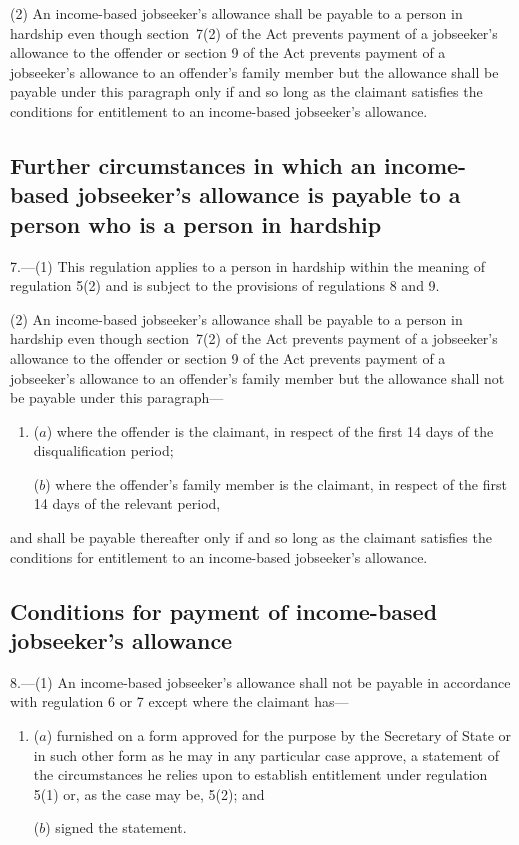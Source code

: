 \documentclass[12pt,a4paper]{article}
\begin{document}
(2) An income-based jobseeker’s allowance shall be payable to a person in hardship even though section~7(2) of the Act prevents payment of a jobseeker’s allowance to the offender or section 9 of the Act prevents payment of a jobseeker’s allowance to an offender’s family member but the allowance shall be payable under this paragraph only if and so long as the claimant satisfies the conditions for entitlement to an income-based jobseeker’s allowance.

{
\subsection[7. Further circumstances in which an income-based jobseeker’s allowance is payable to a person who is a person in hardship]{\sloppy Further circumstances in which an income-based jobseeker’s allowance is payable to a person who is a person in hardship}

}

7.---(1)  This regulation applies to a person in hardship within the meaning of regulation 5(2) and is subject to the provisions of regulations 8 and 9.

(2) An income-based jobseeker’s allowance shall be payable to a person in hardship even though section~7(2) of the Act prevents payment of a jobseeker’s allowance to the offender or section 9 of the Act prevents payment of a jobseeker’s allowance to an offender’s family member but the allowance shall not be payable under this paragraph—
\begin{enumerate}\item[]
($a$) where the offender is the claimant, in respect of the first 14 days of the disqualification period;

($b$) where the offender’s family member is the claimant, in respect of the first 14 days of the relevant period,
\end{enumerate}
and shall be payable thereafter only if and so long as the claimant satisfies the conditions for entitlement to an income-based jobseeker’s allowance.

\subsection[8. Conditions for payment of income-based jobseeker’s allowance]{\sloppy Conditions for payment of income-based jobseeker’s allowance}

8.---(1)  An income-based jobseeker’s allowance shall not be payable in accordance with regulation 6 or 7 except where the claimant has—
\begin{enumerate}\item[]
($a$) furnished on a form approved for the purpose by the Secretary of State or in such other form as he may in any particular case approve, a statement of the circumstances he relies upon to establish entitlement under regulation 5(1) or, as the case may be, 5(2); and

($b$) signed the statement.
\end{enumerate}
\end{document}

